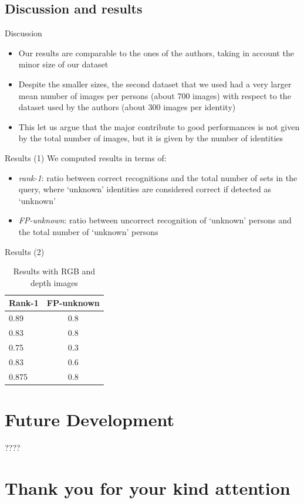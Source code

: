 \documentclass{beamer}
\begin{document}
\subsection{Discussion and results}
\begin{frame}{Discussion}
	\begin{itemize}
		\item Our results are comparable to the ones of the authors,
			taking in account the minor size of our dataset
		\item Despite the smaller sizes, the second dataset that we
			used had a very larger mean number of images per
			persons (about 700 images) with respect to the dataset
			used by the authors (about 300 images per identity)
		\item This let us argue that the major contribute to good
			performances is not given by the total number of images,
			but it is given by the number of identities
	\end{itemize}
\end{frame}

\begin{frame}{Results (1)}
	We computed results in terms of:
	\begin{itemize}
		\item \textit{rank-1}: ratio between correct recognitions and
			the total number of sets in the query, where `unknown'
			identities are considered correct if detected as
			`unknown'
		\item \textit{FP-unknown}: ratio between uncorrect recognition
			of `unknown' persons and the total number of `unknown'
			persons
	\end{itemize}
\end{frame}

\begin{frame}{Results (2)}
	\begin{table}[]
		\centering
		\caption{Results with RGB and depth images}
		\label{tab:results-rgbd}
		\begin{tabular}{|l|c|}
			\hline
			\bf Rank-1 & \bf FP-unknown \\ \hline
			0.89	   & 0.8 \\ \hline
			0.83	   & 0.8 \\ \hline
			0.75	   & 0.3 \\ \hline
			0.83	   & 0.6 \\ \hline
			0.875      & 0.8 \\ \hline
		\end{tabular}
	\end{table}

\end{frame}

\section{Future Development}
\begin{frame}
	????
\end{frame}

\section*{Thank you for your kind attention}
\end{document}
